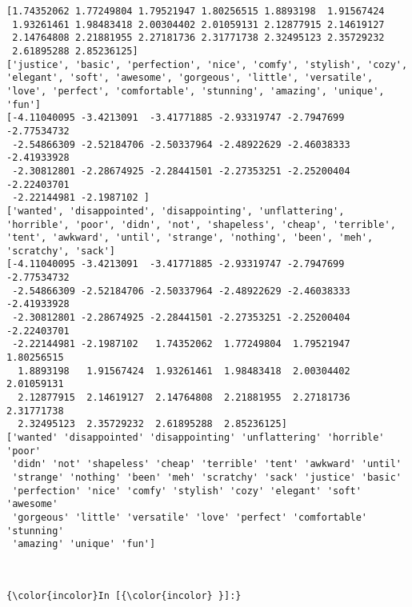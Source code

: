\documentclass[11pt]{article}
\begin{document}
    \begin{Verbatim}[commandchars=\\\{\}]
[1.74352062 1.77249804 1.79521947 1.80256515 1.8893198  1.91567424
 1.93261461 1.98483418 2.00304402 2.01059131 2.12877915 2.14619127
 2.14764808 2.21881955 2.27181736 2.31771738 2.32495123 2.35729232
 2.61895288 2.85236125]
['justice', 'basic', 'perfection', 'nice', 'comfy', 'stylish', 'cozy', 'elegant', 'soft', 'awesome', 'gorgeous', 'little', 'versatile', 'love', 'perfect', 'comfortable', 'stunning', 'amazing', 'unique', 'fun']
[-4.11040095 -3.4213091  -3.41771885 -2.93319747 -2.7947699  -2.77534732
 -2.54866309 -2.52184706 -2.50337964 -2.48922629 -2.46038333 -2.41933928
 -2.30812801 -2.28674925 -2.28441501 -2.27353251 -2.25200404 -2.22403701
 -2.22144981 -2.1987102 ]
['wanted', 'disappointed', 'disappointing', 'unflattering', 'horrible', 'poor', 'didn', 'not', 'shapeless', 'cheap', 'terrible', 'tent', 'awkward', 'until', 'strange', 'nothing', 'been', 'meh', 'scratchy', 'sack']
[-4.11040095 -3.4213091  -3.41771885 -2.93319747 -2.7947699  -2.77534732
 -2.54866309 -2.52184706 -2.50337964 -2.48922629 -2.46038333 -2.41933928
 -2.30812801 -2.28674925 -2.28441501 -2.27353251 -2.25200404 -2.22403701
 -2.22144981 -2.1987102   1.74352062  1.77249804  1.79521947  1.80256515
  1.8893198   1.91567424  1.93261461  1.98483418  2.00304402  2.01059131
  2.12877915  2.14619127  2.14764808  2.21881955  2.27181736  2.31771738
  2.32495123  2.35729232  2.61895288  2.85236125]
['wanted' 'disappointed' 'disappointing' 'unflattering' 'horrible' 'poor'
 'didn' 'not' 'shapeless' 'cheap' 'terrible' 'tent' 'awkward' 'until'
 'strange' 'nothing' 'been' 'meh' 'scratchy' 'sack' 'justice' 'basic'
 'perfection' 'nice' 'comfy' 'stylish' 'cozy' 'elegant' 'soft' 'awesome'
 'gorgeous' 'little' 'versatile' 'love' 'perfect' 'comfortable' 'stunning'
 'amazing' 'unique' 'fun']

    \end{Verbatim}

    \begin{center}
    \end{center}
    { \hspace*{\fill} \\}
    
    \begin{Verbatim}[commandchars=\\\{\}]
{\color{incolor}In [{\color{incolor} }]:} 
\end{Verbatim}
\end{document}

